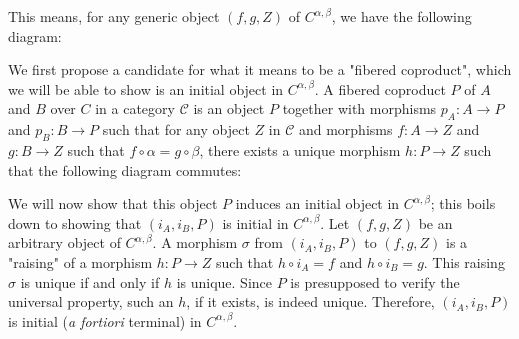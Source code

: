 \documentclass[12pt, letterpaper, twoside]{report}
\begin{document}
This means, for any generic object $(f, g, Z)$ of $C^{\alpha,\beta}$, we have the following diagram:


We first propose a candidate for what it means to be a "fibered coproduct", which we will be able to show is an initial object in $C^{\alpha,\beta}$. A fibered coproduct $P$ of $A$ and $B$ over $C$ in a category $\mathcal{C}$ is an object $P$ together with morphisms $p_A : A \to P$ and $p_B : B \to P$ such that for any object $Z$ in $\mathcal{C}$ and morphisms $f : A \to Z$ and $g : B \to Z$ such that $f \circ \alpha = g \circ \beta$, there exists a unique morphism $h : P \to Z$ such that the following diagram commutes:


We will now show that this object $P$ induces an initial object in $C^{\alpha,\beta}$; this boils down to showing that $(i_A, i_B, P)$ is initial in $C^{\alpha,\beta}$. Let $(f, g, Z)$ be an arbitrary object of $C^{\alpha,\beta}$. A morphism $\sigma$ from $(i_A, i_B, P)$ to $(f, g, Z)$ is a "raising" of a morphism $h : P \to Z$ such that $h \circ i_A = f$ and $h \circ i_B = g$. This raising $\sigma$ is unique if and only if $h$ is unique. Since $P$ is presupposed to verify the universal property, such an $h$, if it exists, is indeed unique. Therefore, $(i_A, i_B, P)$ is initial (\textit{a fortiori} terminal) in $C^{\alpha,\beta}$.
\end{document}
